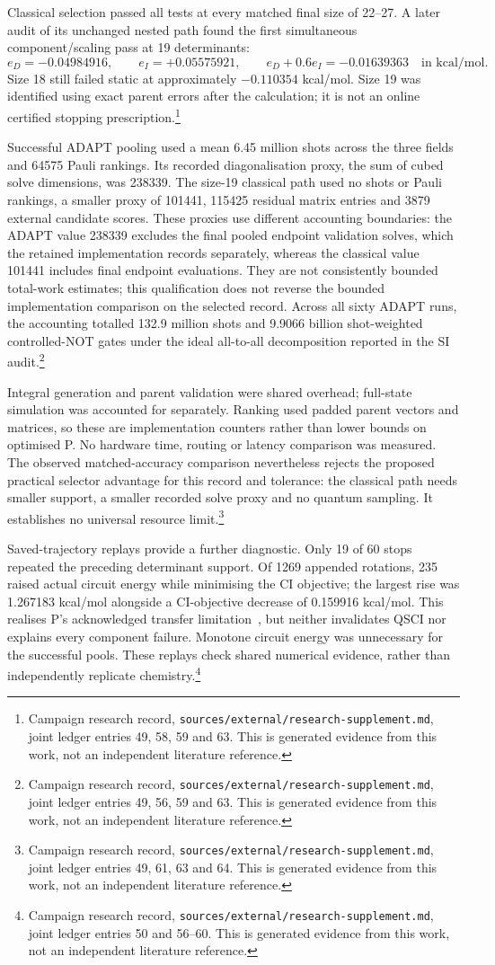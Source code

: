 \documentclass{article}
\newcommand{\record}[1]{\footnote{Campaign research record, \texttt{sources/external/research-supplement.md}, #1. This is generated evidence from this work, not an independent literature reference.}}
\begin{document}
Classical selection passed all tests at every matched final size of 22--27. A later audit of its unchanged nested path found the first simultaneous component/scaling pass at 19 determinants:
\[
 e_D=-0.04984916,\qquad e_I=+0.05575921,\qquad
 e_D+0.6e_I=-0.01639363
 \quad\text{in kcal/mol}.
\]
Size 18 still failed static at approximately \(-0.110354\) kcal/mol. Size 19 was identified using exact parent errors after the calculation; it is not an online certified stopping prescription.\record{joint ledger entries 49, 58, 59 and 63}

Successful ADAPT pooling used a mean 6.45 million shots across the three fields and 64575 Pauli rankings. Its recorded diagonalisation proxy, the sum of cubed solve dimensions, was 238339. The size-19 classical path used no shots or Pauli rankings, a smaller proxy of 101441, 115425 residual matrix entries and 3879 external candidate scores. These proxies use different accounting boundaries: the ADAPT value 238339 excludes the final pooled endpoint validation solves, which the retained implementation records separately, whereas the classical value 101441 includes final endpoint evaluations. They are not consistently bounded total-work estimates; this qualification does not reverse the bounded implementation comparison on the selected record. Across all sixty ADAPT runs, the accounting totalled 132.9 million shots and 9.9066 billion shot-weighted controlled-NOT gates under the ideal all-to-all decomposition reported in the SI audit.\record{joint ledger entries 49, 56, 59 and 63}

Integral generation and parent validation were shared overhead; full-state simulation was accounted for separately. Ranking used padded parent vectors and matrices, so these are implementation counters rather than lower bounds on optimised P. No hardware time, routing or latency comparison was measured. The observed matched-accuracy comparison nevertheless rejects the proposed practical selector advantage for this record and tolerance: the classical path needs smaller support, a smaller recorded solve proxy and no quantum sampling. It establishes no universal resource limit.\record{joint ledger entries 49, 61, 63 and 64}

Saved-trajectory replays provide a further diagnostic. Only 19 of 60 stops repeated the preceding determinant support. Of 1269 appended rotations, 235 raised actual circuit energy while minimising the CI objective; the largest rise was 1.267183 kcal/mol alongside a CI-objective decrease of 0.159916 kcal/mol. This realises P's acknowledged transfer limitation~\cite{P}, but neither invalidates QSCI nor explains every component failure. Monotone circuit energy was unnecessary for the successful pools. These replays check shared numerical evidence, rather than independently replicate chemistry.\record{joint ledger entries 50 and 56--60}
\end{document}

